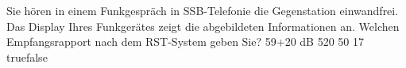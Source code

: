     {Sie hören in einem Funkgespräch in SSB-Telefonie die Gegenstation einwandfrei. Das Display Ihres Funkgerätes zeigt die abgebildeten Informationen an. Welchen Empfangsrapport nach dem RST-System geben Sie?}
    {59+20 dB}
    {520}
    {50}
    {17}
    {true}{false}